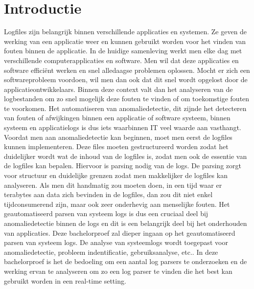 
\section{Introductie} %
\label{sec:introductie}
Logfiles zijn belangrijk binnen verschillende applicaties en systemen. Ze geven de werking van een applicatie weer en kunnen gebruikt worden voor het vinden van fouten binnen de applicatie. In de huidige samenleving werkt men elke dag met verschillende computerapplicaties en software. Men wil dat deze applicaties en software efficiënt werken en snel alledaagse problemen oplossen. Mocht er zich een softwareprobleem voordoen, wil men dan ook dat dit snel wordt opgelost door de applicatieontwikkelaars. Binnen deze context valt dan het analyseren van de logbestanden om zo snel mogelijk deze fouten te vinden of om toekomstige fouten te voorkomen. Het automatiseren van anomaliedetectie, dit zijnde het detecteren van fouten of afwijkingen binnen een applicatie of software systeem, binnen systeem en applicatielogs is dus iets waarbinnen IT veel waarde aan vasthangt. 
Voordat men aan anomaliedetectie kan beginnen, moet men eerst de logfiles kunnen implementeren. Deze files moeten gestructureerd worden zodat het duidelijker wordt wat de inhoud van de logfiles is, zodat men ook de essentie van de logfiles kan bepalen. Hiervoor is parsing nodig van de logs. De parsing zorgt voor structuur en duidelijke grenzen zodat men makkelijker de logfiles kan analyseren. 
Als men dit handmatig zou moeten doen, in een tijd waar er terabytes aan data zich bevinden in de logfiles, dan zou dit niet enkel tijdconsumerend zijn, maar ook zeer onderhevig aan menselijke fouten. 
Het geautomatiseerd parsen van systeem logs is dus een cruciaal deel bij anomaliedetectie binnen de logs en dit is een belangrijk deel bij het onderhouden van applicaties.
Deze bachelorproef zal dieper ingaan op het geautomatiseerd parsen van systeem logs. De analyse van systeemlogs wordt toegepast voor anomaliedetectie, probleem indentificatie, gebruiksanalyse, etc.. In deze bachelorproef is het de bedoeling om een aantal log parsers te onderzoeken en de werking ervan te analyseren om zo een log parser te vinden die het best kan gebruikt worden in een real-time setting.

